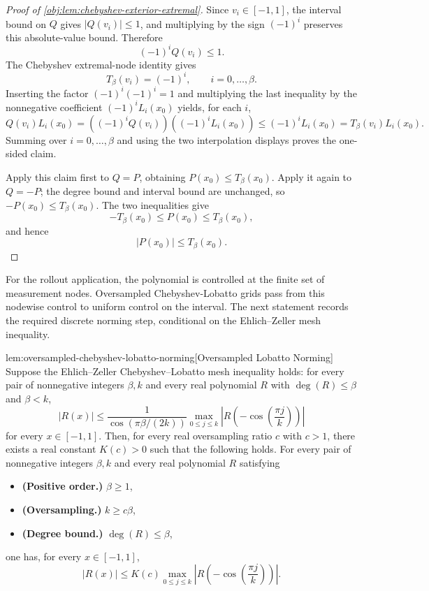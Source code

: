 \documentclass[11pt]{article}
\begin{document}
\begin{proof}[Proof of \cref{obj:lem:chebyshev-exterior-extremal}]
Since \(v_i\in[-1,1]\), the interval bound on \(Q\) gives \(|Q(v_i)|\le1\), and multiplying by the sign \((-1)^i\) preserves this absolute-value bound. Therefore
\[
(-1)^iQ(v_i)\le1.
\] %
The Chebyshev extremal-node identity gives
\[
T_\beta(v_i)=(-1)^i,
\qquad i=0,\ldots,\beta .
\] %
Inserting the factor \((-1)^i(-1)^i=1\) and multiplying the last inequality by the nonnegative coefficient \((-1)^iL_i(x_0)\) yields, for each \(i\),
\[
Q(v_i)L_i(x_0)
=
\left((-1)^iQ(v_i)\right)\left((-1)^iL_i(x_0)\right)
\le
(-1)^iL_i(x_0)
=
T_\beta(v_i)L_i(x_0).
\]
Summing over \(i=0,\ldots,\beta\) and using the two interpolation displays proves the one-sided claim. %

Apply this claim first to \(Q=P\), obtaining \(P(x_0)\le T_\beta(x_0)\). Apply it again to \(Q=-P\); the degree bound and interval bound are unchanged, so \(-P(x_0)\le T_\beta(x_0)\). %
The two inequalities give
\[
-T_\beta(x_0)\le P(x_0)\le T_\beta(x_0),
\]
and hence
\[
|P(x_0)|\le T_\beta(x_0).
\] %
\end{proof}

For the rollout application, the polynomial is controlled at the finite set of measurement nodes. Oversampled Chebyshev-Lobatto grids pass from this nodewise control to uniform control on the interval. The next statement records the required discrete norming step, conditional on the Ehlich--Zeller mesh inequality.

\begin{lemmav}{lem:oversampled-chebyshev-lobatto-norming}[Oversampled Lobatto Norming]
Suppose the Ehlich--Zeller Chebyshev--Lobatto mesh inequality holds: for every pair of nonnegative integers $\beta,k$ and every real polynomial $R$ with $\deg(R)\le \beta$ and $\beta<k$,
\[
 |R(x)|
 \le
 \frac{1}{\cos(\pi\beta/(2k))}
 \max_{0\le j\le k}\left|R\!\left(-\cos\!\left(\frac{\pi j}{k}\right)\right)\right|
\]
for every $x\in[-1,1]$.  Then, for every real oversampling ratio $c$ with $c>1$, there exists a real constant $K(c)>0$ such that the following holds.  For every pair of nonnegative integers $\beta,k$ and every real polynomial $R$ satisfying
\begin{itemize}
\item \textbf{(Positive order.)} $\beta\ge 1$,
\item \textbf{(Oversampling.)} $k\ge c\beta$,
\item \textbf{(Degree bound.)} $\deg(R)\le \beta$,
\end{itemize}
one has, for every $x\in[-1,1]$,
\[
 |R(x)|
 \le
 K(c)
 \max_{0\le j\le k}\left|R\!\left(-\cos\!\left(\frac{\pi j}{k}\right)\right)\right|.
\]
\end{lemmav}
\end{document}
